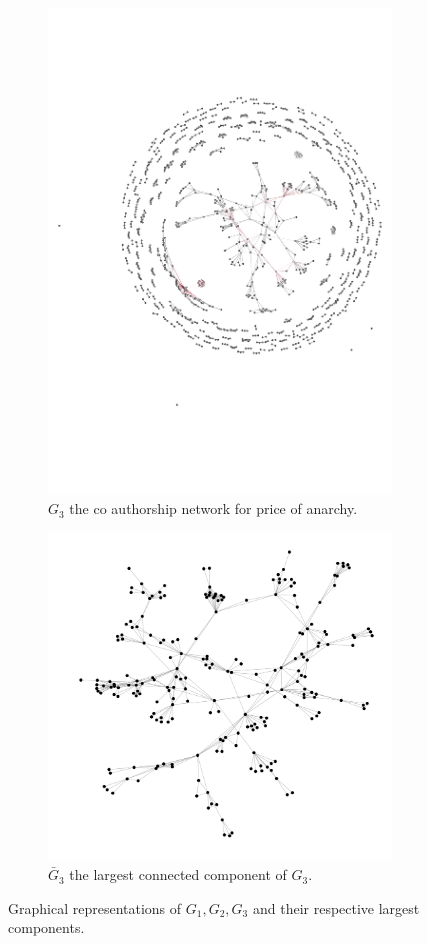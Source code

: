 \documentclass{article}
\theoremstyle{definition}
\begin{document}
\begin{figure}[!hbtp]
    \begin{subfigure}{.45\textwidth}\centering
        \includegraphics[width=.54\textwidth]{./assets/images/anarchy_network.pdf}
        \caption{\(G_3\) the co authorship network for price of anarchy.}\label{fig:g_three}
     \end{subfigure}\hfill
     \begin{subfigure}{.45\textwidth}\centering
        \includegraphics[width=.8\textwidth]{./assets/images/anarchy_network_cluster.pdf}
        \caption{\(\bar{G}_{3}\) the largest connected component of \(G_3\).}\label{fig:g_three_cluster}
     \end{subfigure}
     \caption{Graphical representations of \(G_1, G_2, G_3\) and their respective
     largest components.}
\end{figure}
\end{document}
